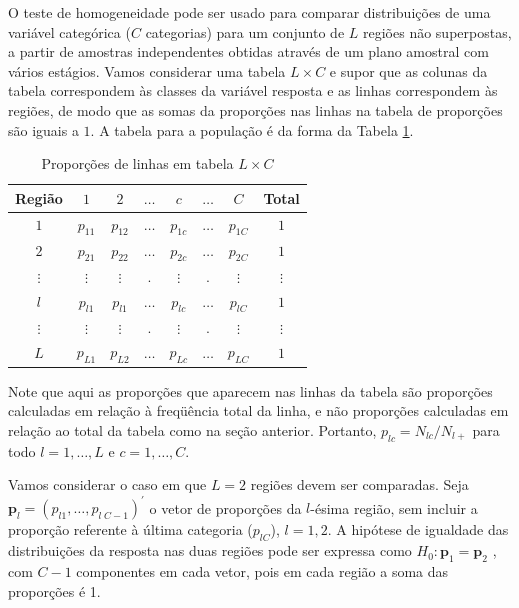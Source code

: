 \documentclass[]{book}
\numberwithin{example}{chapter}
\numberwithin{remark}{chapter}
\numberwithin{definition}{chapter}
\begin{document}
O teste de homogeneidade pode ser usado para comparar distribuições de
uma variável categórica (\(C\) categorias) para um conjunto de \(L\)
regiões não superpostas, a partir de amostras independentes obtidas
através de um plano amostral com vários estágios. Vamos considerar uma
tabela \(L\times C\) e supor que as colunas da tabela correspondem às
classes da variável resposta e as linhas correspondem às regiões, de
modo que as somas da proporções nas linhas na tabela de proporções são
iguais a \(1\). A tabela para a população é da forma da Tabela
\ref{tab82}.

\begin{center}
\begin{table}[tbp] \centering
\caption{Proporções de linhas em tabela $L\times C$}
\bigskip \label{tab82}
\begin{tabular}{|c|cccccc|c|}
\hline\hline
Região & $1$ & $2$ & $\ldots $ & $c$ & $\ldots $ & $C$ & Total \\
\hline\hline
$1$ & $p_{11}$ & $p_{12}$ & $\ldots $ & $p_{1c}$ & $\ldots $ & $p_{1C}$ & $1$
\\
$2$ & $p_{21}$ & $p_{22}$ & $\ldots $ & $p_{2c}$ & $\ldots $ & $p_{2C}$ & $1$
\\
$\vdots $ & $\vdots $ & $\vdots $ & . & $\vdots $ & . & $\vdots $ & $\vdots $
\\
$l$ & $p_{l1}$ & $p_{l1}$ & $\ldots $ & $p_{lc}$ & $\ldots $ & $p_{lC}$ & $1$
\\
$\vdots $ & $\vdots $ & $\vdots $ & . & $\vdots $ & . & $\vdots $ & $\vdots $
\\
$L$ & $p_{L1}$ & $p_{L2}$ & $\ldots $ & $p_{Lc}$ & $\ldots $ & $p_{LC}$ & $1$
\\ \hline\hline
\end{tabular}
\end{table}
\end{center}

Note que aqui as proporções que aparecem nas linhas da tabela são
proporções calculadas em relação à freqüência total da linha, e não
proporções calculadas em relação ao total da tabela como na seção
anterior. Portanto, \(p_{lc}=N_{lc}/N_{l+}\) para todo \(l=1,\ldots ,L\)
e \(c=1,\ldots ,C\).

Vamos considerar o caso em que \(L=2\) regiões devem ser comparadas.
Seja
\(\mathbf{p}_{l}=\left( p_{l1},\ldots ,p_{l\;C-1}\right) ^{\prime }\) o
vetor de proporções da \(l\)-ésima região, sem incluir a proporção
referente à última categoria (\(p_{lC}\)), \(l=1,2.\) A hipótese de
igualdade das distribuições da resposta nas duas regiões pode ser
expressa como \(H_{0}:\mathbf{p}_{1}=\mathbf{p}_{2}\) , com \(C-1\)
componentes em cada vetor, pois em cada região a soma das proporções é
1.
\end{document}

